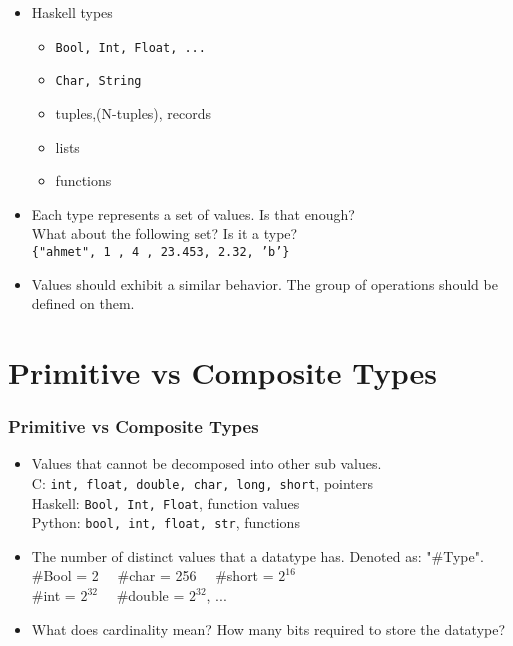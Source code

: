 \begin{frame}
\begin{itemize}
\item Haskell types
\begin{itemize}
\item \texttt{Bool, Int, Float, ...}
\item \texttt{Char, String}
\item tuples,(N-tuples), records
\item lists
\item functions
\end{itemize}
\item Each type represents a set of values.
Is that enough?\\
\pause
What about the following set? Is it a type?\\
\texttt{\{"ahmet", 1 , 4 , 23.453, 2.32, 'b'\}} \pause
\item Values should exhibit a similar behavior. The  group of operations
should be defined on them.
\end{itemize}
\end{frame}

\section{Primitive vs Composite Types}
\begin{frame}
 \frametitle{Primitive vs Composite Types}
\begin{itemize}
\item {} Values that cannot be decomposed into other sub values.\\
	C: \texttt{int, float, double, char, long, short}, pointers\\
	Haskell: \texttt{Bool, Int, Float}, function values\\
	Python: \texttt{bool, int, float, str}, functions
\item {} 
The number of distinct values that a datatype has.
Denoted as: "\#Type".\\
\#Bool = 2 \ \ \#char = 256 \ \ \#short = $2^{16}$ \\
\#int = $2^{32}$ \ \ \#double = $2^{32}$, ...
\item What does cardinality mean?
\pause
How many bits required to store the datatype? 
\end{itemize}
\end{frame}

